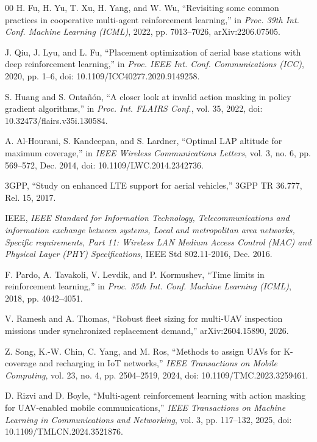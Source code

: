 \documentclass[conference]{IEEEtran}
\begin{document}
\begin{thebibliography}{00}
H. Fu, H. Yu, T. Xu, H. Yang, and W. Wu, ``Revisiting some common practices in cooperative multi-agent reinforcement learning,'' in \emph{Proc. 39th Int. Conf. Machine Learning (ICML)}, 2022, pp. 7013--7026, arXiv:2206.07505.

J. Qiu, J. Lyu, and L. Fu, ``Placement optimization of aerial base stations with deep reinforcement learning,'' in \emph{Proc. IEEE Int. Conf. Communications (ICC)}, 2020, pp. 1--6, doi: 10.1109/ICC40277.2020.9149258.

S. Huang and S. Onta\~n\'on, ``A closer look at invalid action masking in policy gradient algorithms,'' in \emph{Proc. Int. FLAIRS Conf.}, vol. 35, 2022, doi: 10.32473/flairs.v35i.130584.

A. Al-Hourani, S. Kandeepan, and S. Lardner, ``Optimal LAP altitude for maximum coverage,'' in \emph{IEEE Wireless Communications Letters}, vol. 3, no. 6, pp. 569--572, Dec. 2014, doi: 10.1109/LWC.2014.2342736.

3GPP, ``Study on enhanced LTE support for aerial vehicles,'' 3GPP TR 36.777, Rel. 15, 2017.

IEEE, \emph{IEEE Standard for Information Technology, Telecommunications and information exchange between systems, Local and metropolitan area networks, Specific requirements, Part 11: Wireless LAN Medium Access Control (MAC) and Physical Layer (PHY) Specifications}, IEEE Std 802.11-2016, Dec. 2016.

F. Pardo, A. Tavakoli, V. Levdik, and P. Kormushev, ``Time limits in reinforcement learning,'' in \emph{Proc. 35th Int. Conf. Machine Learning (ICML)}, 2018, pp. 4042--4051.

V. Ramesh and A. Thomas, ``Robust fleet sizing for multi-UAV inspection
missions under synchronized replacement demand,'' arXiv:2604.15890, 2026.

Z. Song, K.-W. Chin, C. Yang, and M. Ros, ``Methods to assign UAVs for K-coverage and recharging in IoT networks,'' \emph{IEEE Transactions on Mobile Computing}, vol. 23, no. 4, pp. 2504--2519, 2024, doi: 10.1109/TMC.2023.3259461.

D. Rizvi and D. Boyle, ``Multi-agent reinforcement learning with action masking for UAV-enabled mobile communications,'' \emph{IEEE Transactions on Machine Learning in Communications and Networking}, vol. 3, pp. 117--132, 2025, doi: 10.1109/TMLCN.2024.3521876.


\end{thebibliography}
\end{document}
